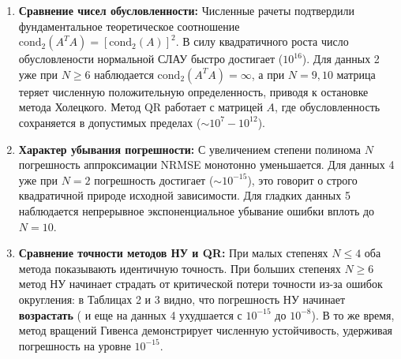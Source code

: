 \documentclass[a4paper,12pt]{article}
\begin{document}
	\begin{enumerate}
		\item \textbf{Сравнение чисел обусловленности:} Численные рачеты подтвердили фундаментальное теоретическое соотношение $\text{cond}_2(A^T A) = [\text{cond}_2(A)]^2$. В силу квадратичного роста число обусловлености нормальной СЛАУ быстро достигает ($10^{16}$). Для данных 2 уже при $N \ge 6$ наблюдается $\text{cond}_2(A^T A) = \infty$, а при $N = 9, 10$ матрица теряет численную положительную определенность, приводя к остановке метода Холецкого. Метод QR работает с матрицей $A$, где обусловленность сохраняется в допустимых пределах ($\sim 10^7 - 10^{12}$).
		
		\item \textbf{Характер убывания погрешности:} С увеличением степени полинома $N$ погрешность аппроксимации NRMSE монотонно уменьшается. Для данных 4 уже при $N = 2$ погрешность достигает ($\sim 10^{-15}$), это говорит о строго квадратичной природе исходной зависимости. Для гладких данных 5 наблюдается непрерывное экспоненциальное убывание ошибки вплоть до $N = 10$.
		
		\item \textbf{Сравнение точности методов НУ и QR:} 
		При малых степенях $N \le 4$ оба метода показывають идентичную точность. При больших степенях $N \ge 6$ метод НУ начинает страдать от критической потери точности из-за ошибок округления: в Таблицах 2 и 3 видно, что погрешность НУ начинает \textbf{возрастать} ( и еще на данных 4 ухудшается с $10^{-15}$ до $10^{-8}$). В то же время, метод вращений Гивенса демонстрирует численную устойчивость, удерживая погрешность на уровне $10^{-15}$.
	\end{enumerate}
	
\end{document}
